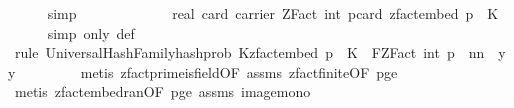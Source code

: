 \begin{isabellebody}
\ \ \ \ \isamarkupfalse%
\ simp\isanewline
\ \ \isamarkupfalse%
\ \isamarkupfalse%
\ {\isachardoublequoteopen}{\isachardot}{\kern0pt}{\isachardot}{\kern0pt}{\isachardot}{\kern0pt}\ {\isacharequal}{\kern0pt}\isanewline
\ \ \ \ {}\ {\isacharslash}{\kern0pt}\ real\ {\isacharparenleft}{\kern0pt}card\ {\isacharparenleft}{\kern0pt}carrier\ {\isacharparenleft}{\kern0pt}ZFact\ {\isacharparenleft}{\kern0pt}int\ p{\isacharparenright}{\kern0pt}{\isacharparenright}{\kern0pt}{\isacharparenright}{\kern0pt}{\isacharparenright}{\kern0pt}{\isacharcircum}{\kern0pt}{\isacharparenleft}{\kern0pt}card\ {\isacharparenleft}{\kern0pt}zfact{\isacharunderscore}{\kern0pt}embed\ p\ {\isacharbackquote}{\kern0pt}\ K{\isacharparenright}{\kern0pt}{\isacharparenright}{\kern0pt}{\isachardoublequoteclose}\isanewline
\ \ \ \ \isamarkupfalse%
\ {\isacharparenleft}{\kern0pt}simp\ only{\isacharcolon}{\kern0pt}\ {\isasymOmega}{\isacharunderscore}{\kern0pt}def{\isacharparenright}{\kern0pt}\isanewline
\ \ \ \ \isamarkupfalse%
\ {\isacharparenleft}{\kern0pt}rule\ UniversalHashFamily{\isachardot}{\kern0pt}hash{\isacharunderscore}{\kern0pt}prob{\isacharbrackleft}{\kern0pt}\ K{\isacharequal}{\kern0pt}{\isachardoublequoteopen}zfact{\isacharunderscore}{\kern0pt}embed\ p\ {\isacharbackquote}{\kern0pt}\ K{\isachardoublequoteclose}\ \ F{\isacharequal}{\kern0pt}{\isachardoublequoteopen}ZFact\ {\isacharparenleft}{\kern0pt}int\ p{\isacharparenright}{\kern0pt}{\isachardoublequoteclose}\ \ n{\isacharequal}{\kern0pt}{\isachardoublequoteopen}n{\isachardoublequoteclose}\ \ y{\isacharequal}{\kern0pt}{\isachardoublequoteopen}y{\isacharprime}{\kern0pt}{\isachardoublequoteclose}{\isacharbrackright}{\kern0pt}{\isacharparenright}{\kern0pt}\isanewline
\ \ \ \ \ \ \ \isamarkupfalse%
\ {\isacharparenleft}{\kern0pt}metis\ zfact{\isacharunderscore}{\kern0pt}prime{\isacharunderscore}{\kern0pt}is{\isacharunderscore}{\kern0pt}field{\isacharbrackleft}{\kern0pt}OF\ assms{\isacharparenleft}{\kern0pt}{}{\isacharparenright}{\kern0pt}{\isacharbrackright}{\kern0pt}\ zfact{\isacharunderscore}{\kern0pt}finite{\isacharbrackleft}{\kern0pt}OF\ p{\isacharunderscore}{\kern0pt}ge{\isacharunderscore}{\kern0pt}{}{\isacharbrackright}{\kern0pt}{\isacharparenright}{\kern0pt}\isanewline
\ \ \ \ \ \ \isamarkupfalse%
\ {\isacharparenleft}{\kern0pt}metis\ zfact{\isacharunderscore}{\kern0pt}embed{\isacharunderscore}{\kern0pt}ran{\isacharbrackleft}{\kern0pt}OF\ p{\isacharunderscore}{\kern0pt}ge{\isacharunderscore}{\kern0pt}{}{\isacharbrackright}{\kern0pt}\ assms{\isacharparenleft}{\kern0pt}{}{\isacharparenright}{\kern0pt}\ image{\isacharunderscore}{\kern0pt}mono{\isacharparenright}{\kern0pt}\isanewline

\end{isabellebody}
